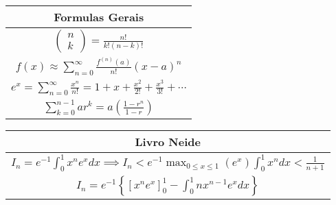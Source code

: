 \documentclass{article}
\begin{document}
\begin{tabular}{c}
Formulas Gerais\\
\hline
$ 
\left( \begin{array}{c}
n\\
k
\end{array}
\right) = \frac{n!}{k!(n-k)!}$\\
$ f(x) \approx \displaystyle \sum_{n=0}^{\infty} \frac{f^{(n)}(a)}{n!}(x-a)^n $\\
$ e^{x} = \sum^{\infty}_{n=0} \frac{x^n}{n!} = 1 + x + \frac{x^2}{2!} + \frac{x^3}{3!} + \cdots $\\
$ \displaystyle \sum_{k=0}^{n-1} ar^k= a \left(\frac{1-r^{n}}{1-r}\right) $
\end{tabular}

\begin{tabular}{c}
Livro Neide\\
\hline
$ I_n = e^{-1} \displaystyle \int_0^1 x^n e^x dx \implies I_n < e^{-1} \max_{0\leq x \leq 1}(e^x) \displaystyle \int_0^1 x^n dx < \frac{1}{n+1} $\\
$ I_n = e^{-1} \left\{ \displaystyle \left[x^n e^x \right]_0^1 - \displaystyle \int_0^1 n x^{n-1} e^x dx \right\} $
\end{tabular}
\end{document}
